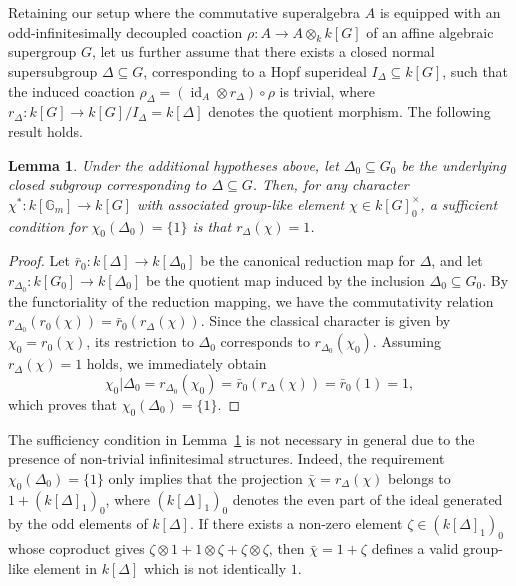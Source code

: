 \documentclass[11pt,a4paper,reqno,noamsfonts]{amsart}
\numberwithin{equation}{section}
\newtheorem{lemma}[theorem]{Lemma}
\theoremstyle{definition}
\theoremstyle{remark}
\DeclareMathOperator{\id}{id}
\begin{document}
Retaining our setup where the commutative superalgebra $A$ is equipped with an odd-infinitesimally decoupled coaction $\rho \colon A \to A \otimes_k k[G]$ of an affine algebraic supergroup $G$, let us further assume that there exists a closed normal supersubgroup $\Delta \subseteq G$, corresponding to a Hopf superideal $I_{\Delta} \subseteq k[G]$, such that the induced coaction $\rho_{\Delta} = (\id_A \otimes r_{\Delta}) \circ \rho$ is trivial, where $r_{\Delta} \colon k[G] \to k[G]/I_{\Delta} = k[\Delta]$ denotes the quotient morphism. The following result holds.

\begin{lemma}\label{lem:4.5}
Under the additional hypotheses above, let $\Delta_0 \subseteq G_0$ be the underlying closed subgroup corresponding to $\Delta \subseteq G$. Then, for any character $\chi^{*} \colon k[\mathbb{G}_m] \to k[G]$ with associated group-like element $\chi \in k[G]_{0}^{\times}$, a sufficient condition for $\chi_0(\Delta_0) = \{1\}$ is that $r_{\Delta}(\chi) = 1$.
\end{lemma}

\begin{proof}
Let $\bar{r}_0 \colon k[\Delta] \to k[\Delta_0]$ be the canonical reduction map for $\Delta$, and let $r_{\Delta_0} \colon k[G_0] \to k[\Delta_0]$ be the quotient map induced by the inclusion $\Delta_0 \subseteq G_0$. By the functoriality of the reduction mapping, we have the commutativity relation $r_{\Delta_0}(r_0(\chi)) = \bar{r}_0(r_{\Delta}(\chi))$. Since the classical character is given by $\chi_0 = r_0(\chi)$, its restriction to $\Delta _{0}$ corresponds to $r_{\Delta_0}(\chi_0)$. Assuming $r_{\Delta}(\chi) = 1$ holds, we immediately obtain
$$
\chi_0 \vert \Delta_0 = r_{\Delta_{0}}(\chi _{0})=\bar{r}_{0}(r_{\Delta }(\chi ))=\bar{r}_{0}(1)=1,
$$
which proves that $\chi_0(\Delta_0) = \{1\}$.
\end{proof}

The sufficiency condition in Lemma~\ref{lem:4.5} is not necessary in general due to the presence of non-trivial infinitesimal structures. Indeed, the requirement $\chi_0(\Delta_0) = \{1\}$ only implies that the projection $\bar{\chi} = r_{\Delta}(\chi)$ belongs to $1 + (k[\Delta]_1)_0$, where $(k[\Delta]_1)_0$ denotes the even part of the ideal generated by the odd elements of $k[\Delta]$. If there exists a non-zero element $\zeta \in (k[\Delta]_1)_0$ whose coproduct gives $\zeta \otimes 1 + 1 \otimes \zeta + \zeta \otimes \zeta$, then $\bar{\chi} = 1 + \zeta$ defines a valid group-like element in $k[\Delta]$ which is not identically $1$.
%
\end{document}
